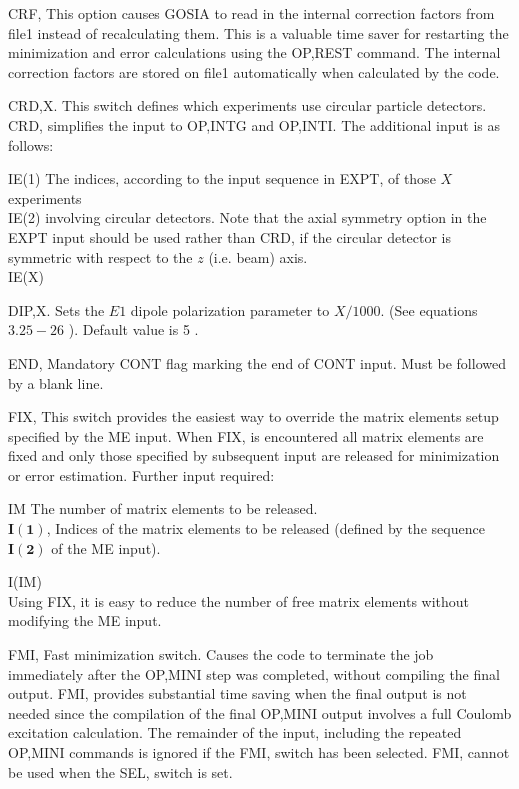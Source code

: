 \documentclass[10pt]{article}
\begin{document}
CRF, This option causes GOSIA to read in the internal correction factors from file1 instead of recalculating them. This is a valuable time saver for restarting the minimization and error calculations using the OP,REST command. The internal correction factors are stored on file1 automatically when calculated by the code.

CRD,X. This switch defines which experiments use circular particle detectors. CRD, simplifies the input to OP,INTG and OP,INTI. The additional input is as follows:

IE(1) The indices, according to the input sequence in EXPT, of those $X$ experiments\\
IE(2) involving circular detectors. Note that the axial symmetry option in the EXPT input should be used rather than CRD, if the circular detector is symmetric with respect to the $z$ (i.e. beam) axis.\\
IE(X)

DIP,X. Sets the $E 1$ dipole polarization parameter to $X / 1000$. (See equations $3.25-26$ ). Default value is 5 .

END, Mandatory CONT flag marking the end of CONT input. Must be followed by a blank line.

FIX, This switch provides the easiest way to override the matrix elements setup specified by the ME input. When FIX, is encountered all matrix elements are fixed and only those specified by subsequent input are released for minimization or error estimation. Further input required:

IM The number of matrix elements to be released.\\
$\mathbf{I}(\mathbf{1})$, Indices of the matrix elements to be released (defined by the sequence\\
$\mathbf{I}(\mathbf{2})$ of the ME input).

I(IM)\\
Using FIX, it is easy to reduce the number of free matrix elements without modifying the ME input.

FMI, Fast minimization switch. Causes the code to terminate the job immediately after the OP,MINI step was completed, without compiling the final output. FMI, provides substantial time saving when the final output is not needed since the compilation of the final OP,MINI output involves a full Coulomb excitation calculation. The remainder of the input, including the repeated OP,MINI commands is ignored if the FMI, switch has been selected. FMI, cannot be used when the SEL, switch is set.
\end{document}
